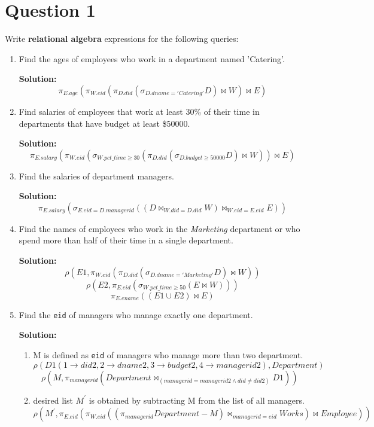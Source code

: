 
\section*{Question 1}

Write \textbf{relational algebra} expressions for the following queries:

\begin{enumerate}[label=(\alph*)]

\item Find the ages of employees who work in a department named 'Catering'.

\textbf{Solution:}
$$ \pi_{E.age}(\pi_{W.eid}(\pi_{D.did}(\sigma_{D.dname = 'Catering'}D)\Join W)\Join E) $$
\item Find salaries of employees that work at least 30\% of their time in departments that have budget at least \$50000.

\textbf{Solution:}
$$ \pi_{E.salary}(\pi_{W.eid}(\sigma_{W.pct\_time \geq 30}(\pi_{D.did}(\sigma_{D.budget \geq 50000}D)\Join W))\Join E) $$

\item Find the salaries of department managers.

\textbf{Solution:}
$$ \pi_{E.salary}(\sigma_{E.eid = D.managerid}((D \Join_{W.did = D.did} W)\Join_{W.eid = E.eid} E)) $$

\item Find the names of employees who work in the \textit{Marketing} department or who spend more than half of their time in a single department.

\textbf{Solution:}
$$\rho(E1,\pi_{W.eid}(\pi_{D.did}(\sigma_{D.dname ='Marketing'}D)\Join W))$$
$$\rho(E2,\pi_{E.eid}(\sigma_{W.pct\_time \geq 50}(E \Join W)))$$
$$\pi_{E.ename}((E1 \cup E2)\Join E) $$

\item Find the \texttt{eid} of managers who manage exactly one department.

\textbf{Solution:}
\begin{enumerate}
\item M is defined as \texttt{eid} of managers who manage more than two department.
$$\rho(D1(1\rightarrow did2, 2\rightarrow dname2, 3\rightarrow budget2, 4\rightarrow managerid2),Department) $$
$$\rho(M,\pi_{managerid}(Department \Join_{(managerid = managerid2 \wedge did \neq did2)} D1 )) $$
\item desired list $M^\prime$ is obtained by subtracting M from the list of all managers.
$$\rho(M^\prime,\pi_{E.eid}(\pi_{W.eid}((\pi_{managerid}Department - M)\Join_{managerid = eid} Works)\Join Employee))$$
\end{enumerate}
\end{enumerate}
